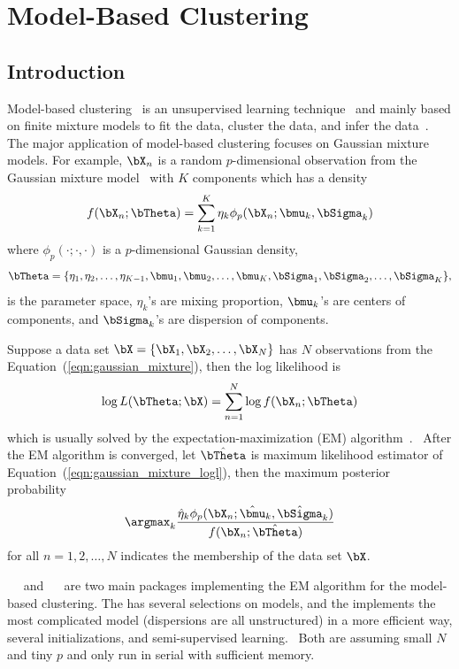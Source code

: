 
\chapter{Model-Based Clustering}
\label{chp:pmclust}

\section{Introduction}

Model-based clustering~
is an unsupervised learning technique~
and mainly based on finite mixture models to fit the data, cluster the data,
and infer the data~\citep{Fraley2002,Melnykov2010}. The major application of
model-based clustering focuses on Gaussian mixture models. For example,
$\bX_n$ is a random $p$-dimensional observation from
the Gaussian mixture model~
with $K$ components which has a density
\begin{equation}
f(\bX_n; \bTheta) = \sum_{k = 1}^K \eta_k \phi_p(\bX_n; \bmu_k, \bSigma_k)
\label{eqn:gaussian_mixture}
\end{equation}
where $\phi_p(\cdot;\cdot,\cdot)$ is a $p$-dimensional Gaussian density,
$$
\bTheta = \{\eta_1, \eta_2, \ldots, \eta_{K-1},
\bmu_1, \bmu_2, \ldots, \bmu_K, \bSigma_1, \bSigma_2, \ldots, \bSigma_K\},
$$
is the parameter space,
$\eta_k$'s are mixing proportion, $\bmu_k$'s are centers of components, and
$\bSigma_k$'s are dispersion of components.

Suppose a data set $\bX = \{\bX_1, \bX_2, \ldots, \bX_N\}$ has
$N$ observations from
the Equation~(\ref{eqn:gaussian_mixture}), then the log likelihood is
\begin{equation}
\log L(\bTheta; \bX) = \sum_{n = 1}^N \log f(\bX_n; \bTheta)
\label{eqn:gaussian_mixture_logl}
\end{equation}
which is usually solved by the expectation-maximization (EM)
algorithm~\citep{Dempster1977}.~
After the EM algorithm is converged, let $\hat{\bTheta}$ is
maximum likelihood estimator of Equation~(\ref{eqn:gaussian_mixture_logl}),
then the maximum posterior probability
$$
\argmax_k
\frac{\hat{\eta}_k\phi_p(\bX_n; \hat{\bmu}_k, \hat{\bSigma}_k)
    }{f(\bX_n; \hat{\bTheta})}
$$
for all $n = 1, 2, \ldots, N$
indicates the membership of the data set $\bX$.


~\citep{mclust}~ and
~\citep{Chen2012EMClusterpackage}~
are two main  packages implementing the EM algorithm for the
model-based clustering.
The  has several selections on models, and the 
implements the most complicated model (dispersions are all unstructured)
in a more efficient way, several initializations, and
semi-supervised learning.~
Both are assuming small $N$ and tiny $p$ and only run in serial with
sufficient memory.

